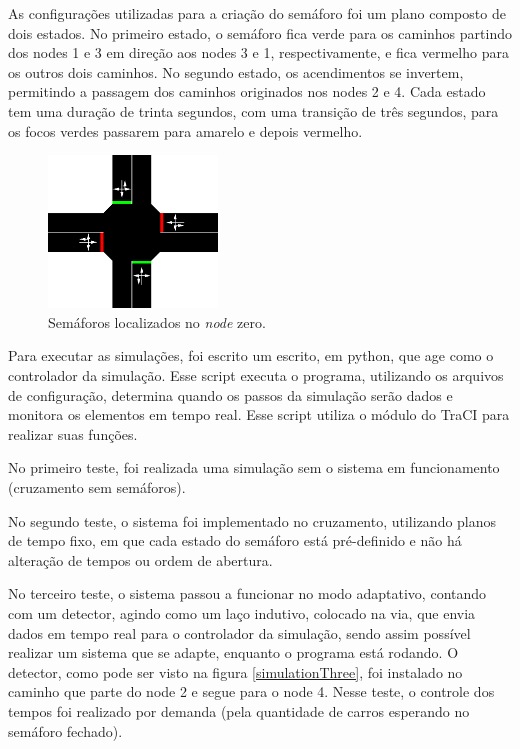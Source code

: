 As configurações utilizadas para a criação do semáforo foi um plano composto de dois estados. No primeiro estado, o semáforo fica verde para os caminhos partindo dos nodes 1 e 3 em direção aos nodes 3 e 1, respectivamente, e fica vermelho para os outros dois caminhos. No segundo estado, os acendimentos se invertem, permitindo a passagem dos caminhos originados nos nodes 2 e 4. Cada estado tem uma duração de trinta segundos, com uma transição de três segundos, para os focos verdes passarem para amarelo e depois vermelho.

\begin{figure}[ht]
    \begin{center}
    \includegraphics[width=0.4\textwidth]{figuras/Traffic_Light.PNG}
    \end{center}
    \caption[Semáforo simulado]{Semáforos localizados no \textit{node} zero.}
    \label{TrafficLight}
\end{figure}

Para executar as simulações, foi escrito um escrito, em python, que age como o controlador da simulação. Esse script executa o programa, utilizando os arquivos de configuração, determina quando os passos da simulação serão dados e monitora os elementos em tempo real. Esse script utiliza o módulo do TraCI para realizar suas funções.

No primeiro teste, foi realizada uma simulação sem o sistema em funcionamento (cruzamento sem semáforos).

No segundo teste, o sistema foi implementado no cruzamento, utilizando planos de tempo fixo, em que cada estado do semáforo está pré-definido e não há alteração de tempos ou ordem de abertura.

No terceiro teste, o sistema passou a funcionar no modo adaptativo, contando com um detector, agindo como um laço indutivo, colocado na via, que envia dados em tempo real para o controlador da simulação, sendo assim possível realizar um sistema que se adapte, enquanto o programa está rodando. O detector, como pode ser visto na figura \ref{simulationThree}, foi instalado no caminho que parte do node 2 e segue para o node 4.
Nesse teste, o controle dos tempos foi realizado por demanda (pela quantidade de carros esperando no semáforo fechado).

